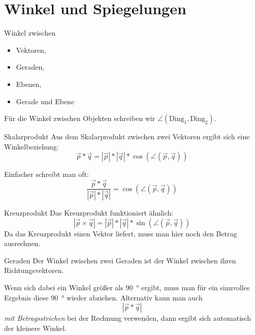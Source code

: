 \chapter{Winkel und Spiegelungen}
\begin{inhalt}
  Winkel zwischen
  \begin{itemize}
  	\item Vektoren,
    \item Geraden,
    \item Ebenen,
    \item Gerade und Ebene
  \end{itemize}
\end{inhalt}

Für die Winkel zwischen Objekten schreiben wir $\angle(\text{Ding}_1,\text{Ding}_2)$.

\begin{bla}{Skalarprodukt}
	Aus dem Skalarprodukt zwischen zwei Vektoren ergibt sich eine Winkelbeziehung:
	\[
	\vec p * \vec q = |\vec p| * |\vec q| * \cos\left(\angle\left(\vec p, \vec q\right)\right)
	\]

	Einfacher schreibt man oft:
	\[
	\frac{\vec p * \vec q }{ |\vec p| * |\vec q| } = \cos\left(\angle\left(\vec p, \vec q\right)\right)
	\]
\end{bla}

\begin{bla}{Kreuzprodukt}
	Das Kreuzprodukt funktioniert ähnlich:
	\[
	| \vec p \times \vec q | = |\vec p| * |\vec q| * \sin\left(\angle\left(\vec p, \vec q\right)\right)
	\]
	Da das Kreuzprodukt einen Vektor liefert, muss man hier noch den Betrag ausrechnen.
\end{bla}

\clearpage

\begin{bla}{Geraden}
	Der Winkel zwischen zwei Geraden ist der Winkel zwischen ihren Richtungsvektoren.

	Wenn sich dabei ein Winkel größer als \SI{90}{\degree} ergibt, muss man für ein sinnvolles Ergebnis diese \SI{90}{\degree} wieder abziehen.
	Alternativ kann man auch $$| \vec p * \vec q |$$ \emph{mit Betragsstrichen} bei der Rechnung verwenden, dann ergibt sich automatisch der kleinere Winkel.
\end{bla}

